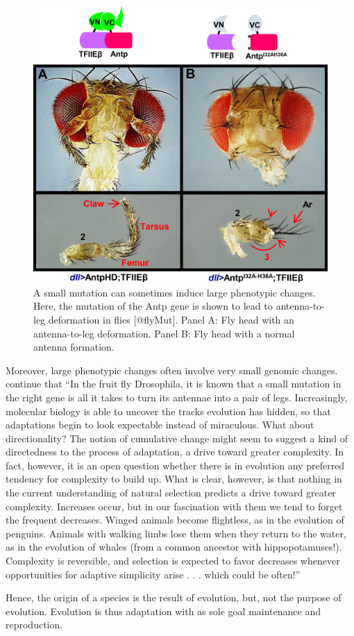 \documentclass[
  11pt,
]{book}
\begin{document}
\begin{figure}

{\centering \includegraphics[width=0.45\linewidth]{./figs/pone.0205905.g006_flyAntennaLegMutation2} 

}

\caption{A small mutation can sometimes induce large phenotypic changes. Here, the mutation of the Antp gene is shown to lead to antenna-to-leg deformation in flies [@flyMut]. Panel A: Fly head with an antenna-to-leg deformation. Panel B: Fly head with a normal antenna formation.}\label{fig:flyEye}
\end{figure}

Moreover, large phenotypic changes often involve very small genomic changes. \citet{rosenberg2008} continue that ``In the fruit fly Drosophila, it is known that a small mutation in the right gene is all it takes to turn its antennae into a pair of legs. Increasingly, molecular biology is able to uncover the tracks evolution has hidden, so that adaptations begin to look expectable instead of miraculous. What about directionality? The notion of cumulative change might seem to suggest a kind of directedness to the process of adaptation, a drive toward greater complexity. In fact, however, it is an open question whether there is in evolution any preferred tendency for complexity to build up. What is clear, however, is that nothing in the current understanding of natural selection predicts a drive toward greater complexity. Increases occur, but in our fascination with them we tend to forget the frequent decreases. Winged animals become flightless, as in the evolution of penguins. Animals with walking limbs lose them when they return to the water, as in the evolution of whales (from a common ancestor with hippopotamuses!). Complexity is reversible, and selection is expected to favor decreases whenever opportunities for adaptive simplicity arise . . . which could be often!''

Hence, the origin of a species is the result of evolution, but, not the purpose of evolution. Evolution is thus adaptation with as sole goal maintenance and reproduction.
\end{document}
